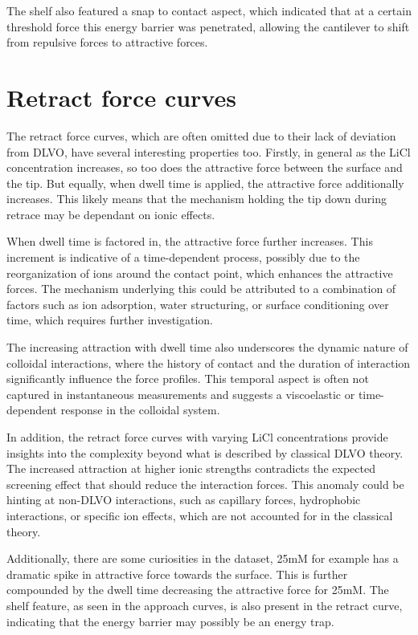 The shelf also featured a snap to contact aspect, which indicated that at a certain threshold force this energy barrier was penetrated, allowing the cantilever to shift from repulsive forces to attractive forces.

\section{Retract force curves}

The retract force curves, which are often omitted due to their lack of deviation from DLVO, have several interesting properties too. Firstly, in general as the LiCl concentration increases, so too does the attractive force between the surface and the tip. But equally, when dwell time is applied, the attractive force additionally increases. This likely means that the mechanism holding the tip down during retrace may be dependant on ionic effects.

When dwell time is factored in, the attractive force further increases. This increment is indicative of a time-dependent process, possibly due to the reorganization of ions around the contact point, which enhances the attractive forces. The mechanism underlying this could be attributed to a combination of factors such as ion adsorption, water structuring, or surface conditioning over time, which requires further investigation.

The increasing attraction with dwell time also underscores the dynamic nature of colloidal interactions, where the history of contact and the duration of interaction significantly influence the force profiles. This temporal aspect is often not captured in instantaneous measurements and suggests a viscoelastic or time-dependent response in the colloidal system.

In addition, the retract force curves with varying LiCl concentrations provide insights into the complexity beyond what is described by classical DLVO theory. The increased attraction at higher ionic strengths contradicts the expected screening effect that should reduce the interaction forces. This anomaly could be hinting at non-DLVO interactions, such as capillary forces, hydrophobic interactions, or specific ion effects, which are not accounted for in the classical theory.

Additionally, there are some curiosities in the dataset, 25mM for example has a dramatic spike in attractive force towards the surface. This is further compounded by the dwell time decreasing the attractive force for 25mM. The shelf feature, as seen in the approach curves, is also present in the retract curve, indicating that the energy barrier may possibly be an energy trap.

